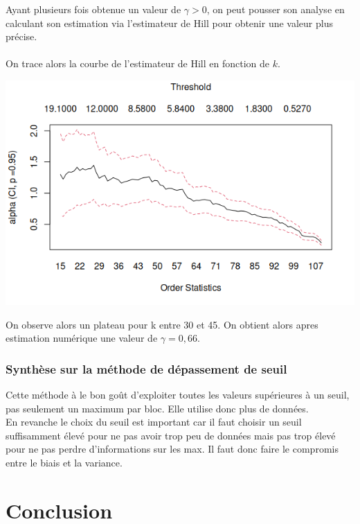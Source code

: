 \documentclass{article}
\theoremstyle{plain}
\theoremstyle{definition}
\theoremstyle{plain}
\begin{document}
\noindent Ayant plusieurs fois obtenue un valeur de $\gamma > 0$, on peut pousser son analyse en calculant son estimation via l'estimateur de Hill pour obtenir une valeur plus précise.
\\
\\
On trace alors la courbe de l'estimateur de Hill en fonction de $k$.

\begin{center}
	\includegraphics[scale=0.65]{./images/danishsad.png} 
\end{center}

\noindent On observe alors un plateau pour k entre 30 et 45. On obtient alors apres estimation numérique une valeur de $\gamma = 0,66$.

\subsubsection{Synthèse sur la méthode de dépassement de seuil}
\noindent Cette méthode à le bon goût d'exploiter toutes les valeurs supérieures à un seuil, pas seulement un maximum par bloc. Elle utilise donc plus de données.
\\
En revanche le choix du seuil est important car il faut choisir un seuil suffisamment élevé pour ne pas avoir trop peu de données mais pas trop élevé pour ne pas perdre d'informations sur les max. Il faut donc faire le compromis entre le biais et la variance.

\section{Conclusion}
\end{document}
